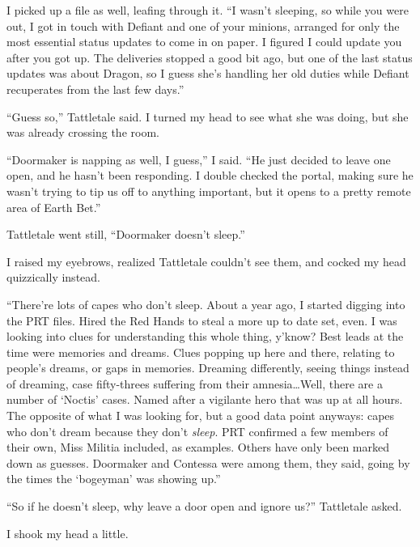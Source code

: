I picked up a file as well, leafing through it.  ``I wasn't sleeping, so while you were out, I got in touch with Defiant and one of your minions, arranged for only the most essential status updates to come in on paper.  I figured I could update you after you got up.  The deliveries stopped a good bit ago, but one of the last status updates was about Dragon, so I guess she's handling her old duties while Defiant recuperates from the last few days.''



``Guess so,'' Tattletale said.  I turned my head to see what she was doing, but she was already crossing the room.



``Doormaker is napping as well, I guess,'' I said.  ``He just decided to leave one open, and he hasn't been responding.  I double checked the portal, making sure he wasn't trying to tip us off to anything important, but it opens to a pretty remote area of Earth Bet.''



Tattletale went still, ``Doormaker doesn't sleep.''



I raised my eyebrows, realized Tattletale couldn't see them, and cocked my head quizzically instead.



``There're lots of capes who don't sleep.  About a year ago, I started digging into the PRT files.  Hired the Red Hands to steal a more up to date set, even.  I was looking into clues for understanding this whole thing, y'know?  Best leads at the time were memories and dreams.  Clues popping up here and there, relating to people's dreams, or gaps in memories.  Dreaming differently, seeing things instead of dreaming, case fifty-threes suffering from their amnesia\ldots Well, there are a number of `Noctis' cases.  Named after a vigilante hero that was up at all hours.  The opposite of what I was looking for, but a good data point anyways: capes who don't dream because they don't \emph{sleep}.  PRT confirmed a few members of their own, Miss Militia included, as examples.  Others have only been marked down as guesses.  Doormaker and Contessa were among them, they said, going by the times the `bogeyman' was showing up.''



``So if he doesn't sleep, why leave a door open and ignore us?'' Tattletale asked.



I shook my head a little.



